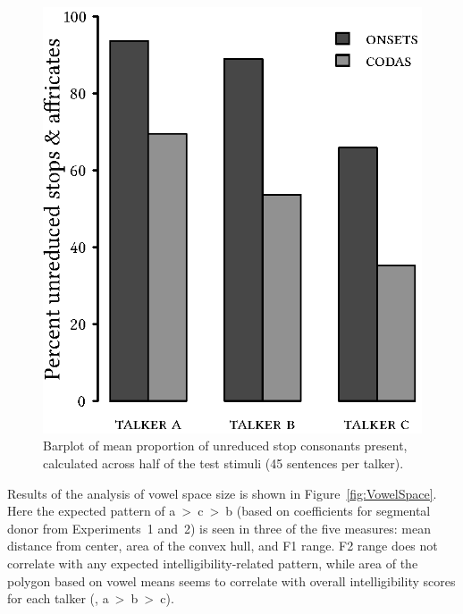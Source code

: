 \begin{figure}[bt]
	\begin{centering}
	\includegraphics{figures/posthocs/ReleaseBursts.eps}
	\caption[Barplot of mean proportion of unreduced stop consonants]{Barplot of mean proportion of unreduced stop consonants present, calculated across half of the test stimuli (45 sentences per talker).\label{fig:ReleaseBursts}}
	\end{centering}
\end{figure}

Results of the \ph{} analysis of vowel space size is shown in Figure~\ref{fig:VowelSpace}.  Here the expected pattern of \ac{a}~>~\ac{c}~>~\ac{b} (based on coefficients for segmental donor from Experiments~1 and~2) is seen in three of the five measures: mean distance from center, area of the convex hull, and F1 range.  F2 range does not correlate with any expected intelligibility-related pattern, while area of the polygon based on vowel means seems to correlate with overall intelligibility scores for each talker (\ie, \ac{a}~>~\ac{b}~>~\ac{c}).  

